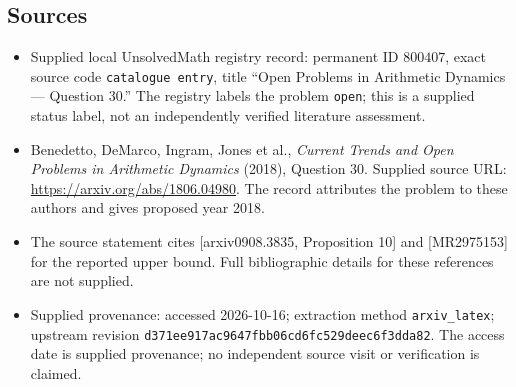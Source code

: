 \documentclass[11pt]{article}
\begin{document}
\subsection{Sources}
\begin{itemize}
\item Supplied local UnsolvedMath registry record: permanent ID \(800407\), exact source code \texttt{catalogue entry}, title ``Open Problems in Arithmetic Dynamics --- Question 30.'' The registry labels the problem \texttt{open}; this is a supplied status label, not an independently verified literature assessment.
\item Benedetto, DeMarco, Ingram, Jones et al., \emph{Current Trends and Open Problems in Arithmetic Dynamics} (2018), Question 30. Supplied source URL: \url{https://arxiv.org/abs/1806.04980}. The record attributes the problem to these authors and gives proposed year 2018.
\item The source statement cites [arxiv0908.3835, Proposition 10] and [MR2975153] for the reported upper bound. Full bibliographic details for these references are not supplied.
\item Supplied provenance: accessed 2026-10-16; extraction method \texttt{arxiv\_latex}; upstream revision \texttt{d371ee917ac9647fbb06cd6fc529deec6f3dda82}. The access date is supplied provenance; no independent source visit or verification is claimed.
\end{itemize}
\end{document}
